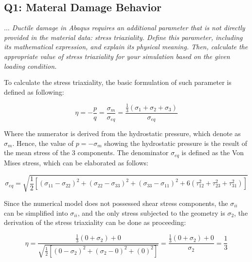 \documentclass[12pt]{article}
\begin{document}
\subsection*{Q1: Materal Damage Behavior}

\vspace{1em}
\begin{tcolorbox}[title=\textbf{Stress Triaxiality}]
\textit{$\dots$ Ductile damage in Abaqus requires an additional parameter that is not directly provided in the material data: stress triaxiality. Define this parameter, including its mathematical expression, and explain its physical meaning. Then, calculate the appropriate value of stress triaxiality for your simulation based on the given loading condition.}
\end{tcolorbox}

\vspace{1em}
To calculate the stress triaxiality, the basic formulation of such parameter is defined as following:

\begin{equation}
  \label{eq:StressTriaxiality}
  \eta = -\frac{p}{q} = \frac{\sigma_m}{\sigma_{eq}} = \frac{\frac{1}{3}(\sigma_1 + \sigma_2 + \sigma_3)}{\sigma_{eq}}
\end{equation}

\vspace{1em}
Where the numerator is derived from the hydrostatic pressure, which denote as $\sigma_m$.
Hence, the value of $p = -\sigma_m$ showing the hydrostatic pressure is the result of the mean
stress of the 3 components. The denominator $\sigma_{eq}$ is defined as the Von Mises stress, which
can be elaborated as follows:

\begin{equation}
  \label{eq:VonMises}
  \sigma_{eq} = \sqrt{\frac{1}{2} \left[ (\sigma_{11} - \sigma_{22})^2 + (\sigma_{22} - \sigma_{33})^2 + (\sigma_{33} - \sigma_{11})^2 + 6(\tau_{12}^2 + \tau_{23}^2 + \tau_{31}^2) \right]}
\end{equation}

\vspace{1em}
Since the numerical model does not possessed shear stress components, the $\sigma_{ii}$ can be
simplified into $\sigma_{ii}$, and the only stress subjected to the geometry is $\sigma_{2}$, 
the derivation of the stress triaxiality can be done as proceeding:

\begin{equation}
  \label{eq:simplified}
  \eta = \frac{\frac{1}{3}(0 + \sigma_2) + 0}{\sqrt{\frac{1}{2} \left[ (0 - \sigma_{2})^2 + (\sigma_{2} - 0)^2 + (0)^2 \right]}} = \frac{\frac{1}{3}(0 + \sigma_2) + 0}{\sigma_2} = \frac{1}{3}
\end{equation}
\end{document}
